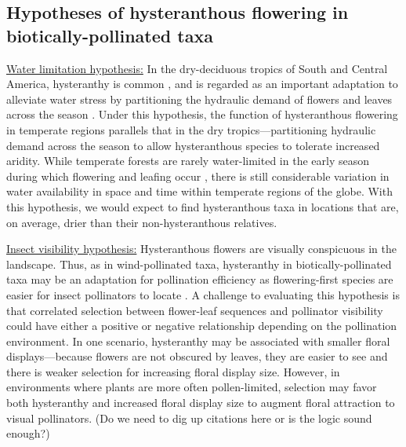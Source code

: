 \documentclass{article}[12pt]
\begin{document}
\subsection*{Hypotheses of hysteranthous flowering in biotically-pollinated taxa}

\underline{Water limitation hypothesis:} In the dry-deciduous tropics of South and Central America, hysteranthy is common \citep{Rathcke_1985,Franklin2016}, and is regarded as an important adaptation to alleviate water stress by partitioning the hydraulic demand of flowers and leaves across the season \citep{Gougherty2018,Franklin2016,Borchert1983,Reich1984}. Under this hypothesis, the function of hysteranthous flowering in temperate regions parallels that in the dry tropics---partitioning hydraulic demand across the season to allow hysteranthous species to tolerate increased aridity. While temperate forests are rarely water-limited in the early season during which flowering and leafing occur \citep{Polgar2011}, there is still considerable variation in water availability in space and time within temperate regions of the globe.  With this hypothesis, we would expect to find hysteranthous taxa in locations that are, on average, drier than their non-hysteranthous relatives.

\underline{Insect visibility hypothesis:} Hysteranthous flowers are visually conspicuous in the landscape. Thus, as in wind-pollinated taxa, hysteranthy in biotically-pollinated taxa may be an adaptation for pollination efficiency as flowering-first species are easier for insect pollinators to locate \citep{Janzen1967}. A challenge to evaluating this hypothesis is that correlated selection between flower-leaf sequences and pollinator visibility could have either a positive or negative relationship depending on the pollination environment. In one scenario, hysteranthy may be associated with smaller floral displays---because flowers are not obscured by leaves, they are easier to see and there is weaker selection for increasing floral display size. However, in environments where plants are more often pollen-limited, selection may favor both hysteranthy and increased floral display size to augment floral attraction to visual pollinators. (Do we need to dig up citations here or is the logic sound enough?)

\end{document}

